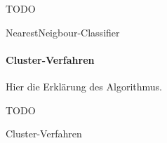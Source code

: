 \begin{algorithm}[H]
	\vspace{0.2cm}
	TODO
	\caption{NearestNeigbour-Classifier}
	\label{alg:nearest_neighbour}
	\vspace{0.2cm}
\end{algorithm}

\paragraph{Cluster-Verfahren}
Hier die Erklärung des Algorithmus.

\begin{algorithm}[H]
	\vspace{0.2cm}
	TODO
	\caption{Cluster-Verfahren}
	\label{alg:cluster}
	\vspace{0.2cm}
\end{algorithm}






